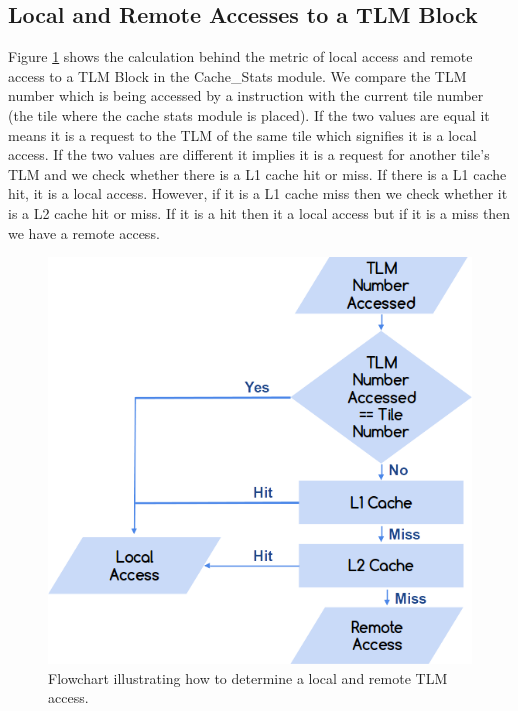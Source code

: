 \documentclass{listhesis}
\begin{document}
\subsection{Local and Remote Accesses to a TLM Block}
Figure \ref{fig:remoteLocalAccess} shows the calculation behind the metric of local access and remote access to a TLM Block in the Cache{\_}Stats module. We compare the TLM number which is being accessed by a instruction with the current tile number (the tile where the cache stats module is placed). If the two values are equal it means it is a request to the TLM of the same tile which signifies it is a local access. If the two values are different it implies it is a request for another tile's TLM and we check whether there is a L1 cache hit or miss. If there is a L1 cache hit, it is a local access. However, if it is a L1 cache miss then we check whether it is a L2 cache hit or miss. If it is a hit then it a local access but if it is a miss then we have a remote access. \\
\begin{figure}
  \includegraphics[width=0.6\linewidth]{localandremote.png}
  \centering
  \caption{Flowchart illustrating how to determine a local and remote TLM access.}
  \label{fig:remoteLocalAccess}
\end{figure}
\end{document}
